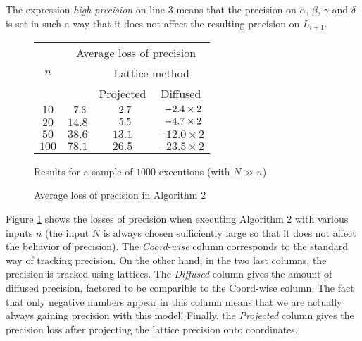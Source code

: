 \documentclass{sig-alternate}
\begin{document}
\noindent
The expression \emph{high precision} on line 3 means that the precision on 
$\alpha$, $\beta$, $\gamma$ and $\delta$ is set in such a way that it 
does not affect the resulting precision on $L_{i+1}$.
%
\begin{figure}
\begin{center}
\renewcommand{\arraystretch}{1.2}
\begin{tabular}{|c|c|c|c|}
\hline
\multirow{3}{*}{\hspace{0.2cm}$n$\hspace{0.2cm}} & 
\multicolumn{3}{|c|}{Average loss of precision} \\
\cline{2-4}
& \raisebox{-0.05cm}{Coord-wise} & 
\multicolumn{2}{|c|}{Lattice method} \\
\cline{3-4}
& \raisebox{0.04cm}{method} & 
\hspace{0.2cm}Projected\hspace{0.2cm} & 
\hspace{0.2cm}Diffused\hspace{0.2cm} \\
\hline 
$10$ & $\hphantom{0}7.3$ & $\hphantom{0}2.7$ & $\hphantom{0}{-}2.4 \times 2$ \\
$20$ & $14.8$ & $\hphantom{0}5.5$ & $\hphantom{0}{-}4.7 \times 2$ \\
$50$ & $38.6$ & $13.1$ & $-12.0 \times 2$ \\
$100$ & $78.1$ & $26.5$ & $-23.5 \times 2$ \\
\hline
\end{tabular}

\smallskip

{\small
Results for a sample of $1000$ executions (with $N \gg n$)}
\end{center}
\renewcommand{\arraystretch}{1}

\vspace{-0.3cm}

\caption{Average loss of precision in Algorithm 2}
\label{fig:vectorspace}
\end{figure}
%
Figure \ref{fig:vectorspace} shows the losses of precision when
executing Algorithm 2 with various inputs $n$ (the input $N$ is
always chosen sufficiently large so that it does not affect the
behavior of precision). The \emph{Coord-wise} column corresponds to
the standard way of tracking precision. On the other hand, in the two 
last columns, the precision is tracked using lattices. The \emph{Diffused}
column gives the amount of diffused precision, factored to be comparible
to the Coord-wise column. 
The fact that only negative numbers appear in this column means that we 
are actually always gaining precision with this model! Finally, the 
\emph{Projected} column gives the precision loss after projecting the lattice
precision onto coordinates.
\end{document}
